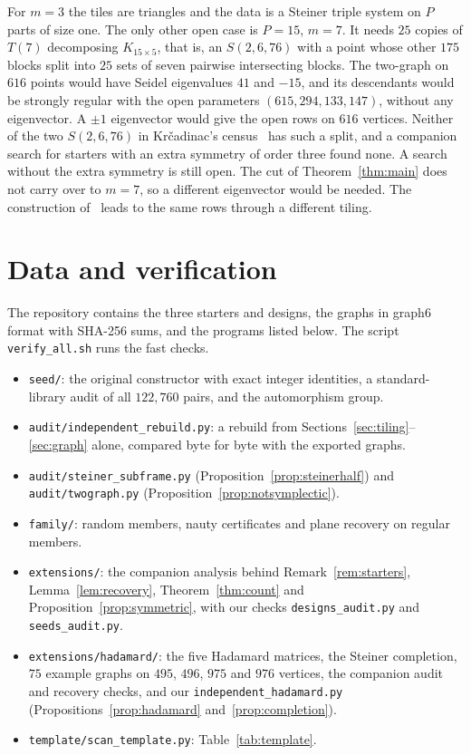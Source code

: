 \documentclass[11pt]{amsart}
\theoremstyle{remark}
\begin{document}
For $m=3$ the tiles are triangles and the data is a Steiner triple system on $P$ parts of size one. The only other open case is $P=15$, $m=7$. It needs $25$ copies of $T(7)$ decomposing $K_{15\times5}$, that is, an $S(2,6,76)$ with a point whose other $175$ blocks split into $25$ sets of seven pairwise intersecting blocks. The two-graph on $616$ points would have Seidel eigenvalues $41$ and $-15$, and its descendants would be strongly regular with the open parameters $(615,294,133,147)$, without any eigenvector. A $\pm1$ eigenvector would give the open rows on $616$ vertices. Neither of the two $S(2,6,76)$ in Kr\v{c}adinac's census~\cite{Krc} has such a split, and a companion search for starters with an extra symmetry of order three found none. A search without the extra symmetry is still open. The cut of Theorem~\ref{thm:main} does not carry over to $m=7$, so a different eigenvector would be needed. The construction of~\cite{P400} leads to the same rows through a different tiling.

\section{Data and verification}\label{sec:data}

The repository contains the three starters and designs, the graphs in graph6 format with SHA-256 sums, and the programs listed below. The script \texttt{verify\_all.sh} runs the fast checks.
\begin{itemize}
\item \texttt{seed/}: the original constructor with exact integer identities, a standard-library audit of all $122{,}760$ pairs, and the automorphism group.
\item \texttt{audit/independent\_rebuild.py}: a rebuild from Sections~\ref{sec:tiling}--\ref{sec:graph} alone, compared byte for byte with the exported graphs.
\item \texttt{audit/steiner\_subframe.py} (Proposition~\ref{prop:steinerhalf}) and \texttt{audit/twograph.py} (Proposition~\ref{prop:notsymplectic}).
\item \texttt{family/}: random members, nauty certificates and plane recovery on regular members.
\item \texttt{extensions/}: the companion analysis behind Remark~\ref{rem:starters}, Lemma~\ref{lem:recovery}, Theorem~\ref{thm:count} and Proposition~\ref{prop:symmetric}, with our checks \texttt{designs\_audit.py} and \texttt{seeds\_audit.py}.
\item \texttt{extensions/hadamard/}: the five Hadamard matrices, the Steiner completion, $75$ example graphs on $495$, $496$, $975$ and $976$ vertices, the companion audit and recovery checks, and our \texttt{independent\_hadamard.py} (Propositions~\ref{prop:hadamard} and~\ref{prop:completion}).
\item \texttt{template/scan\_template.py}: Table~\ref{tab:template}.
\end{itemize}
\end{document}
